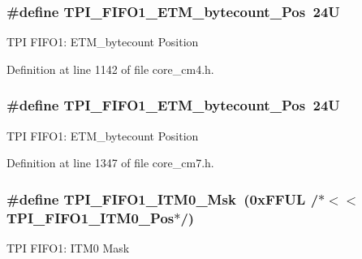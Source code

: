 \subsubsection[{\texorpdfstring{T\+P\+I\+\_\+\+F\+I\+F\+O1\+\_\+\+E\+T\+M\+\_\+bytecount\+\_\+\+Pos}{TPI_FIFO1_ETM_bytecount_Pos}}]{\setlength{\rightskip}{0pt plus 5cm}\#define T\+P\+I\+\_\+\+F\+I\+F\+O1\+\_\+\+E\+T\+M\+\_\+bytecount\+\_\+\+Pos~24U}\hypertarget{group___c_m_s_i_s___t_p_i_gaab31238152b5691af633a7475eaf1f06}{}\label{group___c_m_s_i_s___t_p_i_gaab31238152b5691af633a7475eaf1f06}
T\+PI F\+I\+F\+O1\+: E\+T\+M\+\_\+bytecount Position 

Definition at line 1142 of file core\+\_\+cm4.\+h.

\subsubsection[{\texorpdfstring{T\+P\+I\+\_\+\+F\+I\+F\+O1\+\_\+\+E\+T\+M\+\_\+bytecount\+\_\+\+Pos}{TPI_FIFO1_ETM_bytecount_Pos}}]{\setlength{\rightskip}{0pt plus 5cm}\#define T\+P\+I\+\_\+\+F\+I\+F\+O1\+\_\+\+E\+T\+M\+\_\+bytecount\+\_\+\+Pos~24U}\hypertarget{group___c_m_s_i_s___t_p_i_gaab31238152b5691af633a7475eaf1f06}{}\label{group___c_m_s_i_s___t_p_i_gaab31238152b5691af633a7475eaf1f06}
T\+PI F\+I\+F\+O1\+: E\+T\+M\+\_\+bytecount Position 

Definition at line 1347 of file core\+\_\+cm7.\+h.

\subsubsection[{\texorpdfstring{T\+P\+I\+\_\+\+F\+I\+F\+O1\+\_\+\+I\+T\+M0\+\_\+\+Msk}{TPI_FIFO1_ITM0_Msk}}]{\setlength{\rightskip}{0pt plus 5cm}\#define T\+P\+I\+\_\+\+F\+I\+F\+O1\+\_\+\+I\+T\+M0\+\_\+\+Msk~(0x\+F\+F\+U\+L /$\ast$$<$$<$ T\+P\+I\+\_\+\+F\+I\+F\+O1\+\_\+\+I\+T\+M0\+\_\+\+Pos$\ast$/)}\hypertarget{group___c_m_s_i_s___t_p_i_ga8ae09f544fc1a428797e2a150f14a4c9}{}\label{group___c_m_s_i_s___t_p_i_ga8ae09f544fc1a428797e2a150f14a4c9}
T\+PI F\+I\+F\+O1\+: I\+T\+M0 Mask 

